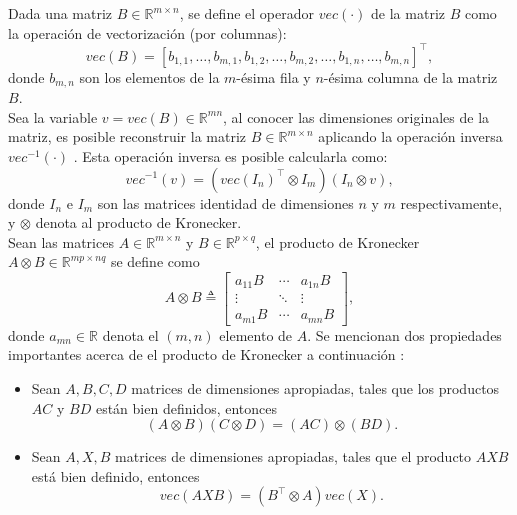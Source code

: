 Dada una matriz $B \in \mathbb{R}^{m \times n}$, se define el operador $vec(\cdot)$ de la matriz $B$ como la operación de vectorización (por columnas):
\begin{equation*}
    vec(B)= \left[b_{1,1},\dots ,b_{m,1},b_{1,2},\dots , b_{m,2}, \dots ,b_{1,n}, \dots , b_{m,n} \right]^{\top},
\end{equation*}
donde $b_{m,n}$ son los elementos de la $m$-ésima fila y $n$-ésima columna de la matriz $B$.\\
Sea la variable $v=vec(B) \in \mathbb{R}^{mn}$, al conocer las dimensiones originales de la matriz, es posible reconstruir la matriz $B \in \mathbb{R}^{m \times n}$ aplicando la operación inversa $vec^{-1}(\cdot)$ \cite{magnus1988matrix}. Esta operación inversa es posible calcularla como:
\begin{equation*}
    vec^{-1}(v) = \left( vec(I_n)^{\top} \otimes I_m \right) \left(I_n \otimes v \right),
\end{equation*}
donde $I_n$ e $I_m$ son las matrices identidad de dimensiones $n$ y $m$ respectivamente, y $\otimes$ denota al producto de Kronecker. \\

Sean las matrices $A \in \mathbb{R}^{m\times n}$ y $B \in \mathbb{R}^{p\times q}$, el producto de Kronecker $A \otimes B \in \mathbb{R}^{mp \times nq}$ se define como
\begin{equation*}
    A \otimes B \triangleq \begin{bmatrix} 
    a_{11}B & \cdots & a_{1n}B \\
    \vdots & \ddots & \vdots \\
    a_{m1}B & \cdots & a_{mn}B
    \end{bmatrix},
\end{equation*}
donde $a_{mn} \in \mathbb{R}$ denota el $(m,n)$ elemento de $A$. Se mencionan dos propiedades importantes acerca de el producto de Kronecker a continuación \cite{bernstein2009matrix,horn13,meyer2000matrix}:
\begin{itemize}
    \item Sean $A,B,C,D$ matrices de dimensiones apropiadas, tales que los productos $AC$ y $BD$ están bien definidos, entonces 
    \begin{equation*}
        (A \otimes B) (C \otimes D) = (AC) \otimes (BD).
    \end{equation*}
    \item Sean $A,X,B$ matrices de dimensiones apropiadas, tales que el producto $AXB$ está bien definido, entonces 
    \begin{equation*}
        vec(AXB)= (B^{\top} \otimes A ) vec(X).
    \end{equation*}
\end{itemize}

